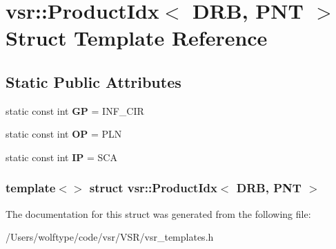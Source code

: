 \hypertarget{structvsr_1_1_product_idx_3_01_d_r_b_00_01_p_n_t_01_4}{\section{vsr\-:\-:Product\-Idx$<$ D\-R\-B, P\-N\-T $>$ Struct Template Reference}
\label{structvsr_1_1_product_idx_3_01_d_r_b_00_01_p_n_t_01_4}
}
\subsection*{Static Public Attributes}
\begin{DoxyCompactItemize}
\item 
\hypertarget{structvsr_1_1_product_idx_3_01_d_r_b_00_01_p_n_t_01_4_a22d21eadb0073659bb77176991d0c6cb}{static const int {\bfseries G\-P} = I\-N\-F\-\_\-\-C\-I\-R}\label{structvsr_1_1_product_idx_3_01_d_r_b_00_01_p_n_t_01_4_a22d21eadb0073659bb77176991d0c6cb}

\item 
\hypertarget{structvsr_1_1_product_idx_3_01_d_r_b_00_01_p_n_t_01_4_a26f00d562272a23b22026c72943fe2e2}{static const int {\bfseries O\-P} = P\-L\-N}\label{structvsr_1_1_product_idx_3_01_d_r_b_00_01_p_n_t_01_4_a26f00d562272a23b22026c72943fe2e2}

\item 
\hypertarget{structvsr_1_1_product_idx_3_01_d_r_b_00_01_p_n_t_01_4_ab2cc7d2adb14612b19bc4fb88e4e1c15}{static const int {\bfseries I\-P} = S\-C\-A}\label{structvsr_1_1_product_idx_3_01_d_r_b_00_01_p_n_t_01_4_ab2cc7d2adb14612b19bc4fb88e4e1c15}

\end{DoxyCompactItemize}
\subsubsection*{template$<$$>$ struct vsr\-::\-Product\-Idx$<$ D\-R\-B, P\-N\-T $>$}



The documentation for this struct was generated from the following file\-:\begin{DoxyCompactItemize}
\item 
/\-Users/wolftype/code/vsr/\-V\-S\-R/vsr\-\_\-templates.\-h\end{DoxyCompactItemize}

